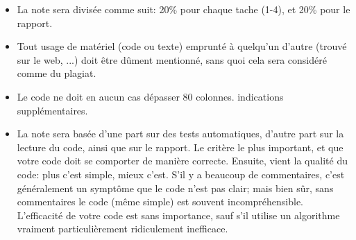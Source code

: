 \documentclass{article}
\begin{document}
\begin{itemize}
\item La note sera divisée comme suit: 20\% pour chaque tache (1-4), et 20\% pour le rapport.
\item Tout usage de matériel (code ou texte) emprunté à quelqu'un d'autre
  (trouvé sur le web, ...) doit être dûment mentionné, sans quoi cela sera
  considéré comme du plagiat.
\item Le code ne doit en aucun cas dépasser 80 colonnes.
  indications supplémentaires.
\item La note sera basée d'une part sur des tests automatiques, d'autre part
  sur la lecture du code, ainsi que sur le rapport.  Le critère le plus
  important, et que votre code doit se comporter de manière correcte.
  Ensuite, vient la qualité du code: plus c'est simple, mieux c'est.
  S'il y a beaucoup de commentaires, c'est généralement un symptôme que le
  code n'est pas clair; mais bien sûr, sans commentaires le code (même
  simple) est souvent incompréhensible.  L'efficacité de votre code est sans
  importance, sauf s'il utilise un algorithme vraiment particulièrement
  ridiculement inefficace.
\end{itemize}
\end{document}
